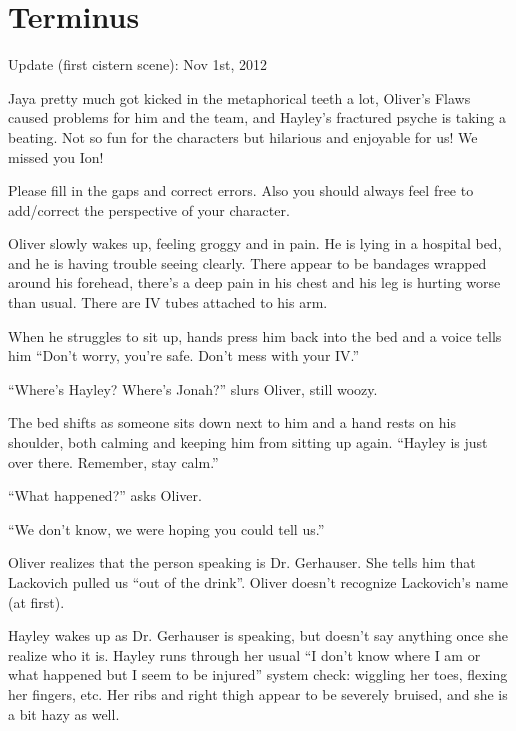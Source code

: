 \setcounter{chapter}{ 7 }
\chapter{\textbf{Terminus} }




Update (first cistern scene): Nov 1st, 2012



Jaya pretty much got kicked in the metaphorical teeth a lot, Oliver's Flaws caused problems for him and the team, and Hayley's fractured psyche is taking a beating.  Not so fun for the characters but hilarious and enjoyable for us!  We missed you Ion!



Please fill in the gaps and correct errors.  Also you should always feel free to add/correct the perspective of your character.






Oliver slowly wakes up, feeling groggy and in pain.  He is lying in a hospital bed, and he is having trouble seeing clearly.  There appear to be bandages wrapped around his forehead, there's a deep pain in his chest and his leg is hurting worse than usual.  There are IV tubes attached to his arm.



When he struggles to sit up, hands press him back into the bed and a voice tells him ``Don't worry, you're safe.  Don't mess with your IV.''

``Where's Hayley?  Where's Jonah?'' slurs Oliver, still woozy.

The bed shifts as someone sits down next to him and a hand rests on his shoulder, both calming and keeping him from sitting up again.  ``Hayley is just over there.  Remember, stay calm.''

``What happened?'' asks Oliver.

``We don't know, we were hoping you could tell us.''



Oliver realizes that the person speaking is Dr. Gerhauser.  She tells him that Lackovich pulled us ``out of the drink''.  Oliver doesn't recognize Lackovich's name (at first).



Hayley wakes up as Dr. Gerhauser is speaking, but doesn't say anything once she realize who it is.  Hayley runs through her usual ``I don't know where I am or what happened but I seem to be injured'' system check: wiggling her toes, flexing her fingers, etc.  Her ribs and right thigh appear to be severely bruised, and she is a bit hazy as well.




